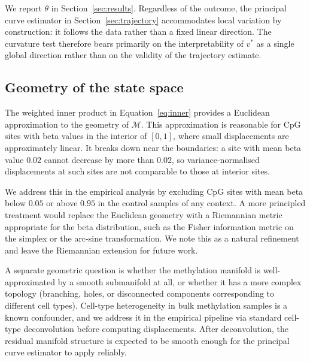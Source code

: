 We report $\theta$ in Section~\ref{sec:results}. Regardless of the outcome, the
principal curve estimator in Section~\ref{sec:trajectory} accommodates local
variation by construction: it follows the data rather than a fixed linear direction.
The curvature test therefore bears primarily on the interpretability of $v^*$ as a
single global direction rather than on the validity of the trajectory estimate.

\subsection{Geometry of the state space}
\label{sec:geometry}

The weighted inner product in Equation~\eqref{eq:inner} provides a Euclidean
approximation to the geometry of $\mathcal{M}$. This approximation is reasonable
for CpG sites with beta values in the interior of $[0,1]$, where small displacements
are approximately linear. It breaks down near the boundaries: a site with mean
beta value $0.02$ cannot decrease by more than $0.02$, so variance-normalised
displacements at such sites are not comparable to those at interior sites.

We address this in the empirical analysis by excluding CpG sites with mean beta
below $0.05$ or above $0.95$ in the control samples of any context. A more principled
treatment would replace the Euclidean geometry with a Riemannian metric appropriate
for the beta distribution, such as the Fisher information metric on the simplex or
the arc-sine transformation. We note this as a natural refinement and leave the
Riemannian extension for future work.

A separate geometric question is whether the methylation manifold is well-approximated
by a smooth submanifold at all, or whether it has a more complex topology (branching,
holes, or disconnected components corresponding to different cell types). Cell-type
heterogeneity in bulk methylation samples is a known confounder, and we address it
in the empirical pipeline via standard cell-type deconvolution before computing
displacements. After deconvolution, the residual manifold structure is expected to
be smooth enough for the principal curve estimator to apply reliably.

